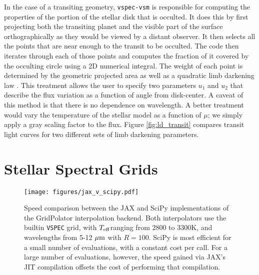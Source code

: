 \documentclass[twocolumn,linenumbers]{aastex631}
\newcommand{\teff}{$T_{\rm eff}$}
\newcommand{\vspec}[1]{\texttt{VSPEC}#1}
\begin{document}
In the case of a transiting geometry, \texttt{vspec-vsm} is responsible for computing the properties of the portion of the stellar disk that is occulted. It does this by first projecting both the transiting planet and the visible part of the surface orthographically as they would be viewed by a distant observer. It then selects all the points that are near enough to the transit to be occulted. The code then iterates through each of those points and computes the fraction of it covered by the occulting circle using a 2D numerical integral. The weight of each point is determined by the geometric projected area as well as a quadratic limb darkening law \citep[see][]{espinoza2015}. This treatment allows the user to specify two parameters $u_1$ and $u_2$ that describe the flux variation as a function of angle from disk-center. A caveat of this method is that there is no dependence on wavelength. A better treatment would vary the temperature of the stellar model as a function of $\mu$; we simply apply a gray scaling factor to the flux. Figure \ref{fig:ld_transit} compares transit light curves for two different sets of limb darkening parameters.


\section{Stellar Spectral Grids}
\label{sec:gridpolator}

\begin{figure}
    \centering
    \texttt{[image: figures/jax\_v\_scipy.pdf]}
    \caption{
        Speed comparison between the JAX and SciPy implementations of the GridPolator interpolation backend. Both interpolators use the builtin \vspec{} grid, with \teff ranging from 2800 to 3300K, and wavelengths from 5-12 ${\rm \mu m}$ with $R=100$. SciPy is most efficient for a small number of evaluations, with a constant cost per call. For a large number of evaluations, however, the speed gained via JAX's JIT compilation offsets the cost of performing that compilation.
    }
    \label{fig:jax_v_scipy}
\end{figure}
\end{document}
